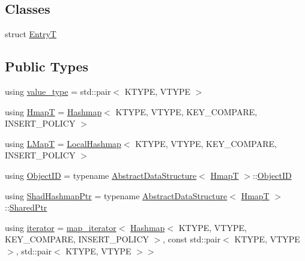 \subsection*{Classes}
\begin{DoxyCompactItemize}
\item 
struct \hyperlink{structshad_1_1Hashmap_1_1EntryT}{Entry\-T}
\end{DoxyCompactItemize}
\subsection*{Public Types}
\begin{DoxyCompactItemize}
\item 
using \hyperlink{classshad_1_1Hashmap_ad8c0108347b59bcd19ccb8070a313dd8}{value\-\_\-type} = std\-::pair$<$ K\-T\-Y\-P\-E, V\-T\-Y\-P\-E $>$
\item 
using \hyperlink{classshad_1_1Hashmap_a8a56b050ace0e26454959cc45cdcb211}{Hmap\-T} = \hyperlink{classshad_1_1Hashmap}{Hashmap}$<$ K\-T\-Y\-P\-E, V\-T\-Y\-P\-E, K\-E\-Y\-\_\-\-C\-O\-M\-P\-A\-R\-E, I\-N\-S\-E\-R\-T\-\_\-\-P\-O\-L\-I\-C\-Y $>$
\item 
using \hyperlink{classshad_1_1Hashmap_aace37116c38330a70352a3081d0ec07e}{L\-Map\-T} = \hyperlink{classshad_1_1LocalHashmap}{Local\-Hashmap}$<$ K\-T\-Y\-P\-E, V\-T\-Y\-P\-E, K\-E\-Y\-\_\-\-C\-O\-M\-P\-A\-R\-E, I\-N\-S\-E\-R\-T\-\_\-\-P\-O\-L\-I\-C\-Y $>$
\item 
using \hyperlink{classshad_1_1Hashmap_a1f10a3b0cce639008b5b9444eb167f8b}{Object\-I\-D} = typename \hyperlink{classshad_1_1AbstractDataStructure}{Abstract\-Data\-Structure}$<$ \hyperlink{classshad_1_1Hashmap_a8a56b050ace0e26454959cc45cdcb211}{Hmap\-T} $>$\-::\hyperlink{classshad_1_1Hashmap_a1f10a3b0cce639008b5b9444eb167f8b}{Object\-I\-D}
\item 
using \hyperlink{classshad_1_1Hashmap_a5d013a5199b5745a1877b321af1b86ee}{Shad\-Hashmap\-Ptr} = typename \hyperlink{classshad_1_1AbstractDataStructure}{Abstract\-Data\-Structure}$<$ \hyperlink{classshad_1_1Hashmap_a8a56b050ace0e26454959cc45cdcb211}{Hmap\-T} $>$\-::\hyperlink{classshad_1_1AbstractDataStructure_a8bb29450966955c546d40421ce46316f}{Shared\-Ptr}
\item 
using \hyperlink{classshad_1_1Hashmap_a2500b369fd011d6a9d5e98ff213c9c66}{iterator} = \hyperlink{classshad_1_1map__iterator}{map\-\_\-iterator}$<$ \hyperlink{classshad_1_1Hashmap}{Hashmap}$<$ K\-T\-Y\-P\-E, V\-T\-Y\-P\-E, K\-E\-Y\-\_\-\-C\-O\-M\-P\-A\-R\-E, I\-N\-S\-E\-R\-T\-\_\-\-P\-O\-L\-I\-C\-Y $>$, const std\-::pair$<$ K\-T\-Y\-P\-E, V\-T\-Y\-P\-E $>$, std\-::pair$<$ K\-T\-Y\-P\-E, V\-T\-Y\-P\-E $>$$>$
$$
\end{DoxyCompactItemize}

